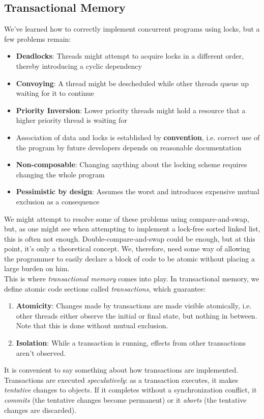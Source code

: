 \documentclass[main]{subfiles}
\begin{document}
\subsection{Transactional Memory}
We've learned how to correctly implement concurrent programs using locks, but a few problems remain:
\begin{itemize}
    \item \textbf{Deadlocks}: Threads might attempt to acquire locks in a different order, thereby introducing a cyclic dependency
    \item \textbf{Convoying}: A thread might be descheduled while other threads queue up waiting for it to continue
    \item \textbf{Priority Inversion}: Lower priority threads might hold a resource that a higher priority thread is waiting for
    \item Association of data and locks is established by \textbf{convention}, i.e. correct use of the program by future developers depends on reasonable documentation
    \item \textbf{Non-composable}: Changing anything about the locking scheme requires changing the whole program
    \item \textbf{Pessimistic by design}: Assumes the worst and introduces expensive mutual exclusion as a consequence
\end{itemize}
We might attempt to resolve some of these problems using compare-and-swap, but, as one might see when attempting to implement a lock-free sorted linked list, this is often not enough. Double-compare-and-swap could be enough, but at this point, it's only a theoretical concept. We, therefore, need some way of allowing the programmer to easily declare a block of code to be atomic without placing a large burden on him.\\[3mm]
This is where \textit{transactional memory} comes into play. In transactional memory, we define atomic code sections called \textit{transactions}, which guarantee:
\begin{enumerate}
    \item \textbf{Atomicity}: Changes made by transactions are made visible atomically, i.e. other threads either observe the initial or final state, but nothing in between. Note that this is done without mutual exclusion.
    \item \textbf{Isolation}: While a transaction is running, effects from other transactions aren't observed.
\end{enumerate}
It is convenient to say something about how transactions are implemented. Transactions are executed \textit{speculatively}: as a transaction executes, it makes \textit{tentative} changes to objects. If it completes without a synchronization conflict, it \textit{commits} (the tentative changes become permanent) or it \textit{aborts} (the tentative changes are discarded).
\end{document}
